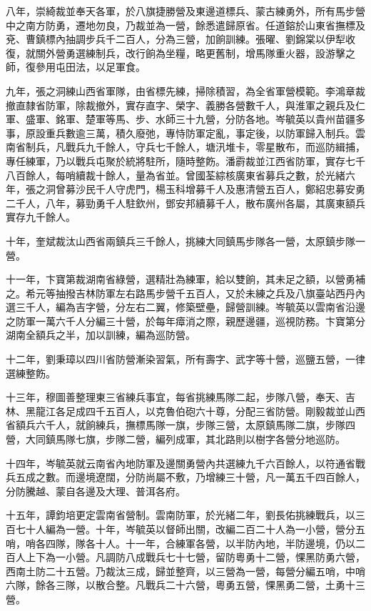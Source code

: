 \begin{pinyinscope}
八年，崇綺裁並奉天各軍，於八旗捷勝營及東邊道標兵、蒙古練勇外，所有馬步營中之南方防勇，遷地勿良，乃裁並為一營，餘悉遣歸原省。任道鎔於山東省撫標及兗、曹鎮標內抽調步兵千二百人，分為三營，加餉訓練。張曜、劉錦棠以伊犁收復，就關外營勇選練制兵，改行餉為坐糧，略更舊制，增馬隊重火器，設游擊之師，復參用屯田法，以足軍食。

九年，張之洞練山西省軍隊，由省標先練，掃除積習，為全省軍營模範。李鴻章裁撤直隸省防軍，除裁撤外，實存直字、榮字、義勝各營數千人，與淮軍之親兵及仁軍、盛軍、銘軍、楚軍等馬、步、水師三十九營，分防各地。岑毓英以貴州苗疆多事，原設重兵數逾三萬，積久廢弛，專恃防軍定亂，事定後，以防軍歸入制兵。雲南省制兵，凡戰兵九千餘人，守兵七千餘人，塘汛堆卡，零星散布，而巡防緝捕，專任練軍，乃以戰兵屯聚於統將駐所，隨時整飭。潘霨裁並江西省防軍，實存七千八百餘人，每哨續裁十餘人，量為省並。曾國荃綜核廣東省募兵之數，於光緒六年，張之洞曾募沙民千人守虎門，楊玉科增募千人及惠清營五百人，鄭紹忠募安勇二千人，八年，募勁勇千人駐欽州，鄧安邦續募千人，散布廣州各屬，其廣東額兵實存九千餘人。

十年，奎斌裁汰山西省兩鎮兵三千餘人，挑練大同鎮馬步隊各一營，太原鎮步隊一營。

十一年，卞寶第裁湖南省綠營，選精壯為練軍，給以雙餉，其未足之額，以營勇補之。希元等抽撥吉林防軍左右路馬步營千五百人，又於未練之兵及八旗臺站西丹內選三千人，編為吉字營，分左右二翼，修築壁壘，歸營訓練。岑毓英以雲南省沿邊之防軍一萬六千人分編三十營，於每年瘴消之際，親歷邊疆，巡視防務。卞寶第分湖南全額兵之半，加以訓練，編為巡防營。

十二年，劉秉璋以四川省防營漸染習氣，所有壽字、武字等十營，巡鹽五營，一律選練整飭。

十三年，穆圖善整理東三省練兵事宜，每省挑練馬隊二起，步隊八營，奉天、吉林、黑龍江各足成四千五百人，以克魯伯砲六十尊，分配三省防營。剛毅裁並山西省額兵六千人，就餉練兵，撫標馬隊一旗，步隊三營，太原鎮馬隊二旗，步隊四營，大同鎮馬隊七旗，步隊二營，編列成軍，其北路則以樹字各營分地巡防。

十四年，岑毓英就云南省內地防軍及邊關勇營內共選練九千六百餘人，以符通省戰兵五成之數。而邊境遼闊，分防尚屬不敷，乃增練三十營，凡一萬五千四百餘人，分防騰越、蒙自各邊及大理、普洱各府。

十五年，譚鈞培更定雲南省營制。雲南防軍，於光緒二年，劉長佑挑練戰兵，以三百七十人編為一營。十年，岑毓英以督師出關，改編二百二十人為一小營，營分五哨，哨各四隊，隊各十人。十一年，合練軍各營，以半防內地，半防邊境，仍以二百人上下為一小營。凡調防八成戰兵七十七營，留防粵勇十二營，惈黑防勇六營，西南土防二十五營。乃裁汰三成，歸並整齊，以三營為一營，每營分編五哨，中哨六隊，餘各三隊，以散合整。凡戰兵二十六營，粵勇五營，惈黑勇二營，土勇十三營。


\end{pinyinscope}
